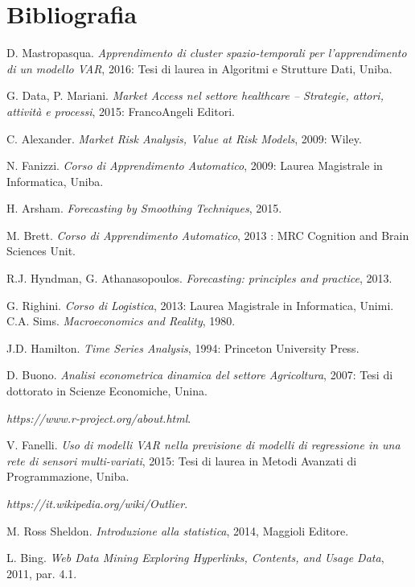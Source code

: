 \documentclass[12pt,a4paper,twoside,openright]{book}
\begin{document}
\chapter{Bibliografia}
  \begin{thebibliography}{1}

   D. Mastropasqua. {\em Apprendimento di cluster spazio-temporali per l'apprendimento di un modello VAR}, 2016: Tesi di laurea in Algoritmi e Strutture Dati, Uniba.

   G. Data, P. Mariani. {\em Market Access nel settore healthcare – Strategie, attori, attività e processi}, 2015:  FrancoAngeli Editori.

   C. Alexander. {\em Market Risk Analysis, Value at Risk Models}, 2009: Wiley.

   N. Fanizzi. {\em Corso di Apprendimento Automatico}, 2009: Laurea Magistrale in Informatica, Uniba.
  
   H. Arsham. {\em Forecasting by Smoothing Techniques}, 2015.
  
   M. Brett. {\em Corso di Apprendimento Automatico}, 2013 : MRC Cognition and Brain Sciences Unit.
  
     R.J. Hyndman, G. Athanasopoulos. {\em Forecasting: principles and practice}, 2013.
    
     G. Righini. {\em Corso di Logistica}, 2013: Laurea Magistrale in Informatica, Unimi.
     C.A. Sims. {\em Macroeconomics and Reality}, 1980.
    
     J.D. Hamilton. {\em Time Series Analysis}, 1994: Princeton University Press.
   
     D. Buono. {\em Analisi econometrica dinamica del settore Agricoltura}, 2007: Tesi di dottorato in Scienze Economiche, Unina.
    
     {\em https://www.r-project.org/about.html}.
    
     V. Fanelli. {\em Uso di modelli VAR nella previsione di modelli di regressione in una rete di sensori multi-variati}, 2015: Tesi di laurea in Metodi Avanzati di Programmazione, Uniba.
    
      {\em https://it.wikipedia.org/wiki/Outlier}.
     
      M. Ross Sheldon. {\em Introduzione alla statistica}, 2014, Maggioli Editore.
      
      L. Bing. {\em Web Data Mining Exploring Hyperlinks, Contents, and Usage Data}, 2011, par. 4.1.
     

\end{thebibliography}
\end{document}
